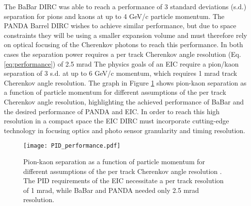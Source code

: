 \label{ch:eicdirc}
The BaBar DIRC was able to reach a performance of 3 standard deviations (s.d.) separation for pions and kaons at up to 4 GeV/c particle momentum. The PANDA Barrel DIRC wishes to achieve similar performance, but due to space constraints they will be using a smaller expansion volume and must therefore rely on optical focusing of the Cherenkov photons to reach this performance. In both cases the separation power requires a per track Cherenkov angle resolution (Eq. \ref{eq:performance}) of 2.5 mrad The physics goals of an EIC require a pion/kaon separation of 3 s.d. at up to 6 GeV/c momentum, which requires 1 mrad track Cherenkov angle resolution. The graph in Figure \ref{fig:PID_performance} shows pion-kaon separation as a function of particle momentum for different assumptions of the per track Cherenkov angle resolution, highlighting the achieved performance of BaBar and the desired performance of PANDA and EIC. In order to reach this high resolution in a compact space the EIC DIRC must incorporate cutting-edge technology in focusing optics and photo sensor granularity and timing resolution.

\begin{figure}[!htb]
	\centering
	\texttt{[image: PID\_performance.pdf]}
	\caption[Pion-kaon separation as a function of particle momentum for different assumptions of the per track Cherenkov angle resolution.]{Pion-kaon separation as a function of particle momentum for different assumptions of the per track Cherenkov angle resolution \cite{GregDIRC2015}. The PID requirements of the EIC necessitate a per track resolution of 1 mrad, while BaBar and PANDA needed only 2.5 mrad resolution.}
	\label{fig:PID_performance}
\end{figure}

